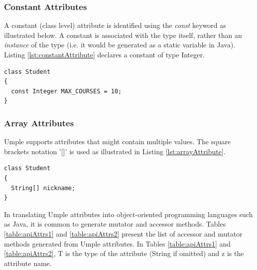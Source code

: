 \subsubsection{Constant Attributes}
A constant (class level) attribute is identified using the \textit{const} keyword as illustrated below. A constant is associated with the type itself, rather than an \textit{instance} of the type (i.e. it would be generated as a static variable in Java). Listing \ref{lst:constantAttribute} declares a constant of type Integer. 

\begin{lstlisting}[style=umplePlain,label=lst:constantAttribute, caption=Constants in Umple]
class Student 
{
  const Integer MAX_COURSES = 10;
}
\end{lstlisting}

\subsubsection{Array Attributes}
Umple supports attributes that might contain multiple values. The square brackets notation '[]' is used as illustrated in Listing \ref{lst:arrayAttribute}.

\begin{lstlisting}[style=umplePlain,label=lst:arrayAttribute, caption=Array attributes]
class Student 
{
  String[] nickname;
}
\end{lstlisting}

In translating Umple attributes into object-oriented programming languages such as Java, it is common to generate mutator and accessor methods. Tables \ref{table:apiAttrs1} and \ref{table:apiAttrs2} present the list of accessor and mutator methods generated from Umple attributes. In Tables \ref{table:apiAttrs1} and \ref{table:apiAttrs2}, T is the type of the attribute (String if omitted) and z is the attribute name.	


